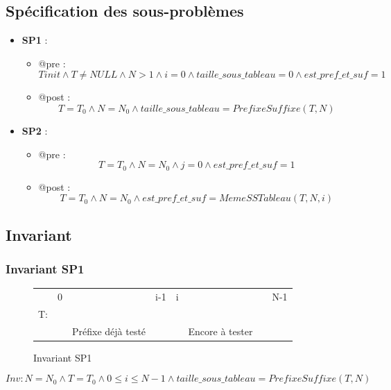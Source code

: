 \documentclass[a4paper, 11pt, oneside]{article}
\begin{document}
\subsection{Spécification des sous-problèmes}
\begin{itemize}
  \item \textbf{SP1} : 
  \begin{itemize}
    \item @pre : $$Tinit\wedge T\neq NULL \wedge N>1 \wedge i=0 \wedge taille\_sous\_tableau=0 \wedge est\_pref\_et\_suf=1$$
    \item @post : $$T=T_0\wedge N=N_0\wedge taille\_sous\_tableau=PrefixeSuffixe (T, N)$$
  \end{itemize}
  \item \textbf{SP2} :
  \begin{itemize}
  \item @pre : $$T=T_0\wedge N=N_0\wedge j=0\wedge est\_pref\_et\_suf=1$$
  \item @post : $$T=T_0\wedge N=N_0\wedge est\_pref\_et\_suf=MemeSSTableau(T, N, i)$$
  \end{itemize}
\end{itemize}

\newpage

\subsection{Invariant}
\subsubsection{Invariant SP1}

\begin{figure}[h]
  \centering
  \begin{tabular}{l|lcr|lcr|l}
   & 0 &  & \multicolumn{1}{r|}{i-1} & i &  & &N-1 \\ \cline{2-7}
  T: & \cellcolor[HTML]{00ff09} & \cellcolor[HTML]{00ff09} & \cellcolor[HTML]{00ff09} & \cellcolor[HTML]{a3160f} &  \cellcolor[HTML]{a3160f}& \cellcolor[HTML]{a3160f} \\ \cline{2-7}
  &&Préfixe déjà testé&&&Encore à tester&& \\ \cline{2-7}
  \end{tabular}
  \caption{Invariant SP1}
\end{figure}

$$Inv: N=N_0 \wedge T=T_0\wedge 0\leq i\leq N-1\wedge taille\_sous\_tableau=PrefixeSuffixe (T, N)$$
\end{document}
